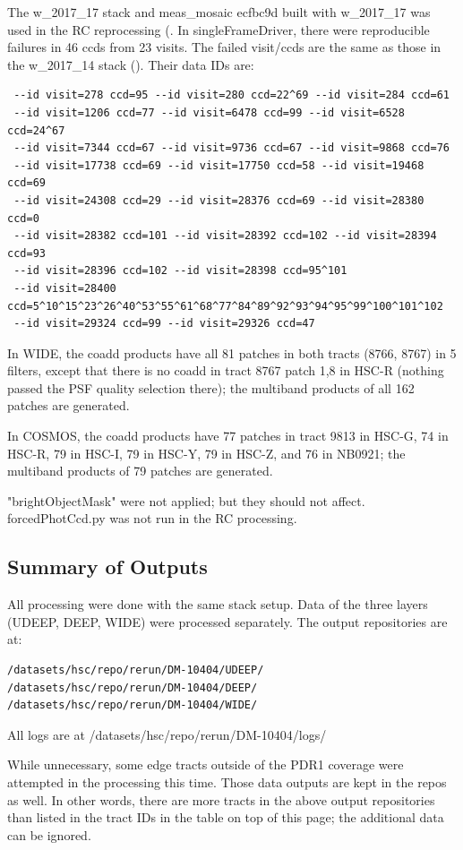 \documentclass[DM,authoryear,toc]{lsstdoc}
\begin{document}
The w{\_}2017{\_}17 stack and meas{\_}mosaic ecfbc9d built with w{\_}2017{\_}17 was used in the RC reprocessing (.
In singleFrameDriver, there were reproducible failures in 46 ccds from 23 visits. The failed visit/ccds are the same as those in the w{\_}2017{\_}14 stack (). Their data IDs are:
\begin{verbatim}
 --id visit=278 ccd=95 --id visit=280 ccd=22^69 --id visit=284 ccd=61
 --id visit=1206 ccd=77 --id visit=6478 ccd=99 --id visit=6528 ccd=24^67
 --id visit=7344 ccd=67 --id visit=9736 ccd=67 --id visit=9868 ccd=76
 --id visit=17738 ccd=69 --id visit=17750 ccd=58 --id visit=19468 ccd=69
 --id visit=24308 ccd=29 --id visit=28376 ccd=69 --id visit=28380 ccd=0
 --id visit=28382 ccd=101 --id visit=28392 ccd=102 --id visit=28394 ccd=93
 --id visit=28396 ccd=102 --id visit=28398 ccd=95^101
 --id visit=28400 ccd=5^10^15^23^26^40^53^55^61^68^77^84^89^92^93^94^95^99^100^101^102
 --id visit=29324 ccd=99 --id visit=29326 ccd=47
\end{verbatim}

In WIDE, the coadd products have all 81 patches in both tracts (8766, 8767) in 5 filters, except that there is no coadd in tract 8767 patch 1,8 in HSC-R (nothing passed the PSF quality selection there); the multiband products of all 162 patches are generated.

In COSMOS, the coadd products have 77 patches in tract 9813 in HSC-G, 74 in HSC-R, 79 in HSC-I, 79 in HSC-Y, 79 in HSC-Z, and 76 in NB0921; the multiband products of 79 patches are generated.

"brightObjectMask" were not applied; but they should not affect. forcedPhotCcd.py was not run in the RC processing.

\subsection{Summary of Outputs}
All processing were done with the same stack setup. Data of the three layers (UDEEP, DEEP, WIDE) were processed separately.
The output repositories are at:
\begin{verbatim}
/datasets/hsc/repo/rerun/DM-10404/UDEEP/
/datasets/hsc/repo/rerun/DM-10404/DEEP/
/datasets/hsc/repo/rerun/DM-10404/WIDE/
\end{verbatim}
All logs are at /datasets/hsc/repo/rerun/DM-10404/logs/

While unnecessary, some edge tracts outside of the PDR1 coverage were attempted in the processing this time. Those data outputs are kept in the repos as well. In other words, there are more tracts in the above output repositories than listed in the tract IDs in the table on top of this page; the additional data can be ignored.
\end{document}
